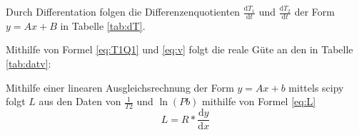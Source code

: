  \begin{table}
   \centering
   \label{tab:daten}
 \end{table}

 \begin{table}
   \centering
   \label{tab:Guete}
 \end{table}

 \begin{table}
   \centering
   \label{tab:Ableitungen}
 \end{table}

Durch Differentation folgen die Differenzenquotienten $\frac{\text{d}T_1}{\text{d}t}$ und $\frac{\text{d}T_2}{\text{d}t}$ der Form $y = Ax+B$ in Tabelle \ref{tab:dT}.

Mithilfe von Formel \ref{eq:T1Q1} und \ref{eq:v} folgt die reale Güte an den in Tabelle \ref{tab:datv}:


Mithilfe einer linearen Ausgleichsrechnung der Form $y=Ax+b$ mittels scipy folgt
$L$ aus den Daten von $\frac{1}{T2}$ und $\ln(Pb)$ mithilfe von Formel \ref{eq:L}
 \begin{equation}
   L = R*\frac{\text{d}y}{\text{d}x}\label{eq:L}
 \end{equation}
\begin{table}
  \centering
  \label{tab:massen}
\end{table}

\begin{table}
  \centering
  \label{tab:Leistung}
\end{table}
